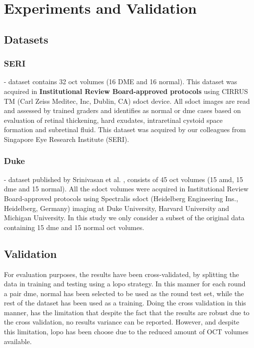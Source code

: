 
\section{Experiments and Validation }
\subsection{Datasets}
\subsubsection{SERI} - dataset contains 32 \ac{oct} volumes (16 DME and 16 normal). This dataset was acquired in \textbf{Institutional Review Board-approved protocols} using CIRRUS TM (Carl Zeiss Meditec, Inc, Dublin, CA) \ac{sdoct} device. All \ac{sdoct} images are read and assessed by trained graders and identifies as normal or \ac{dme} cases based on evaluation of retinal thickening, hard exudates, intraretinal cystoid space formation and subretinal fluid. This dataset was acquired by our colleagues from Singapore Eye Research Institute (SERI). 

\subsubsection{Duke} - dataset published by Srinivasan et al. \cite{Srinivasan2014}, consists of 45 \ac{oct} volumes (15 \ac{amd}, 15 \ac{dme} and 15 normal). All the \ac{sdoct} volumes were acquired in Institutional Review Board-approved protocols using Spectralis \ac{sdoct} (Heidelberg Engineering Ins., Heidelberg, Germany) imaging at Duke University, Harvard University and Michigan University. In this study we only consider a subset of the original data containing 15 \ac{dme} and 15 normal \ac{oct} volumes.

\subsection{Validation}
For evaluation purposes, the results have been cross-validated, by splitting the data in training and testing using a \ac{lopo} strategy. In this manner for each round a pair \ac{dme}, normal has been selected to be used as the round test set, while the rest of the dataset has been used as a training. Doing the cross validation in this manner, has the limitation that despite the fact that the results are robust due to the cross validation, no results variance can be reported. However, and despite this limitation, \ac{lopo} has been choose due to the reduced amount of OCT volumes available.

